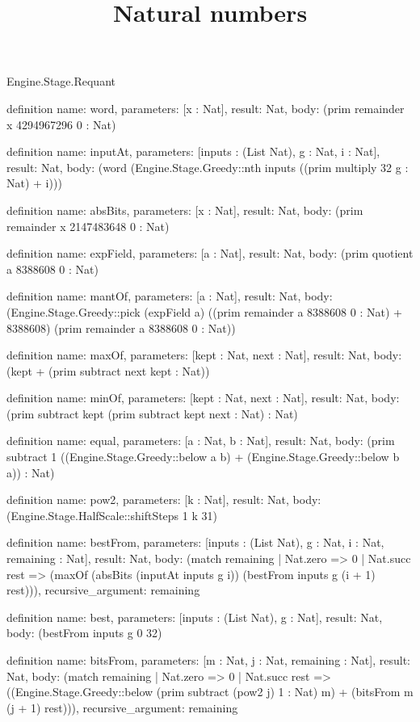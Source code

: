 \begin{lexlean}{Engine.Stage.Requant}
\title{Natural numbers}
\begin{semanticmodule}
definition{
  name: word,
  parameters: [x : Nat],
  result: Nat,
  body: (prim remainder x 4294967296 0 : Nat)
}

definition{
  name: inputAt,
  parameters: [inputs : (List Nat), g : Nat, i : Nat],
  result: Nat,
  body: (word (Engine.Stage.Greedy::nth inputs ((prim multiply 32 g : Nat) + i)))
}

definition{
  name: absBits,
  parameters: [x : Nat],
  result: Nat,
  body: (prim remainder x 2147483648 0 : Nat)
}

definition{
  name: expField,
  parameters: [a : Nat],
  result: Nat,
  body: (prim quotient a 8388608 0 : Nat)
}

definition{
  name: mantOf,
  parameters: [a : Nat],
  result: Nat,
  body: (Engine.Stage.Greedy::pick (expField a) ((prim remainder a 8388608 0 : Nat) + 8388608) (prim remainder a 8388608 0 : Nat))
}

definition{
  name: maxOf,
  parameters: [kept : Nat, next : Nat],
  result: Nat,
  body: (kept + (prim subtract next kept : Nat))
}

definition{
  name: minOf,
  parameters: [kept : Nat, next : Nat],
  result: Nat,
  body: (prim subtract kept (prim subtract kept next : Nat) : Nat)
}

definition{
  name: equal,
  parameters: [a : Nat, b : Nat],
  result: Nat,
  body: (prim subtract 1 ((Engine.Stage.Greedy::below a b) + (Engine.Stage.Greedy::below b a)) : Nat)
}

definition{
  name: pow2,
  parameters: [k : Nat],
  result: Nat,
  body: (Engine.Stage.HalfScale::shiftSteps 1 k 31)
}

definition{
  name: bestFrom,
  parameters: [inputs : (List Nat), g : Nat, i : Nat, remaining : Nat],
  result: Nat,
  body: (match remaining
    | Nat.zero => 0
    | Nat.succ rest => (maxOf (absBits (inputAt inputs g i)) (bestFrom inputs g (i + 1) rest))),
  recursive_argument: remaining
}

definition{
  name: best,
  parameters: [inputs : (List Nat), g : Nat],
  result: Nat,
  body: (bestFrom inputs g 0 32)
}

definition{
  name: bitsFrom,
  parameters: [m : Nat, j : Nat, remaining : Nat],
  result: Nat,
  body: (match remaining
    | Nat.zero => 0
    | Nat.succ rest => ((Engine.Stage.Greedy::below (prim subtract (pow2 j) 1 : Nat) m) + (bitsFrom m (j + 1) rest))),
  recursive_argument: remaining
}


\end{semanticmodule}
\end{lexlean}

